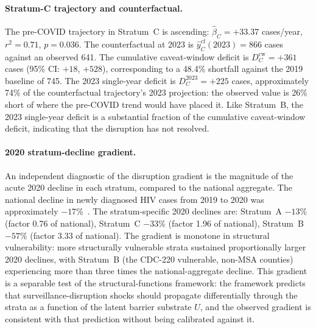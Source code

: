 \documentclass[11pt]{article}
\begin{document}
\paragraph{Stratum-C trajectory and counterfactual.} The pre-COVID trajectory in Stratum~C is ascending: $\hat\beta_C = +33.37$ cases/year, $r^2 = 0.71$, $p = 0.036$. The counterfactual at 2023 is $\hat{y}_C^{\mathrm{cf}}(2023) = 866$ cases against an observed 641. The cumulative caveat-window deficit is $D_C^{\mathrm{cw}} = +361$ cases (95\% CI: $+18$, $+528$), corresponding to a 48.4\% shortfall against the 2019 baseline of 745. The 2023 single-year deficit is $D_C^{2023} = +225$ cases, approximately 74\% of the counterfactual trajectory's 2023 projection: the observed value is 26\% short of where the pre-COVID trend would have placed it. Like Stratum~B, the 2023 single-year deficit is a substantial fraction of the cumulative caveat-window deficit, indicating that the disruption has not resolved.

\paragraph{2020 stratum-decline gradient.} An independent diagnostic of the disruption gradient is the magnitude of the acute 2020 decline in each stratum, compared to the national aggregate. The national decline in newly diagnosed HIV cases from 2019 to 2020 was approximately $-17\%$~\cite{dinenno2022}. The stratum-specific 2020 declines are: Stratum~A $-13\%$ (factor 0.76 of national), Stratum~C $-33\%$ (factor 1.96 of national), Stratum~B $-57\%$ (factor 3.33 of national). The gradient is monotone in structural vulnerability: more structurally vulnerable strata sustained proportionally larger 2020 declines, with Stratum~B (the CDC-220 vulnerable, non-MSA counties) experiencing more than three times the national-aggregate decline. This gradient is a separable test of the structural-functions framework: the framework predicts that surveillance-disruption shocks should propagate differentially through the strata as a function of the latent barrier substrate $U$, and the observed gradient is consistent with that prediction without being calibrated against it.
\end{document}
